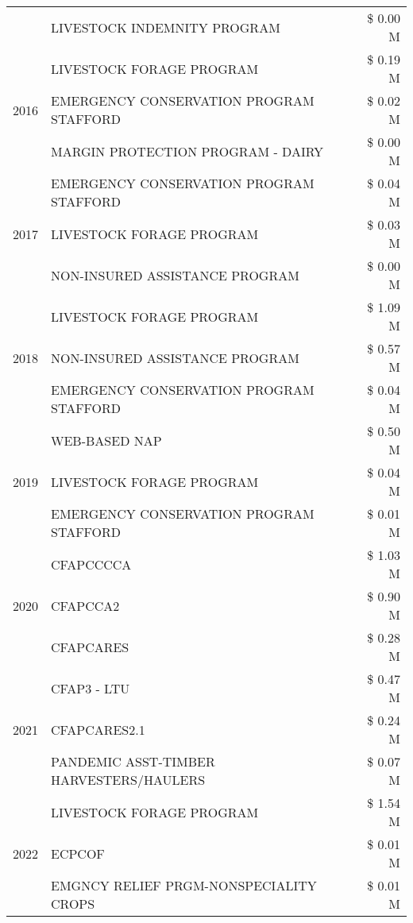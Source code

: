 \begin{tabular}{llr}
 & LIVESTOCK INDEMNITY PROGRAM & \$ 0.00 M \\
\cline{1-3}
\multirow[t]{3}{*}{2016} & LIVESTOCK FORAGE PROGRAM & \$ 0.19 M \\
 & EMERGENCY CONSERVATION PROGRAM STAFFORD & \$ 0.02 M \\
 & MARGIN PROTECTION PROGRAM - DAIRY & \$ 0.00 M \\
\cline{1-3}
\multirow[t]{3}{*}{2017} & EMERGENCY CONSERVATION PROGRAM STAFFORD & \$ 0.04 M \\
 & LIVESTOCK FORAGE PROGRAM & \$ 0.03 M \\
 & NON-INSURED ASSISTANCE PROGRAM & \$ 0.00 M \\
\cline{1-3}
\multirow[t]{3}{*}{2018} & LIVESTOCK FORAGE PROGRAM & \$ 1.09 M \\
 & NON-INSURED ASSISTANCE PROGRAM & \$ 0.57 M \\
 & EMERGENCY CONSERVATION PROGRAM STAFFORD & \$ 0.04 M \\
\cline{1-3}
\multirow[t]{3}{*}{2019} & WEB-BASED NAP & \$ 0.50 M \\
 & LIVESTOCK FORAGE PROGRAM & \$ 0.04 M \\
 & EMERGENCY CONSERVATION PROGRAM STAFFORD & \$ 0.01 M \\
\cline{1-3}
\multirow[t]{3}{*}{2020} & CFAPCCCCA & \$ 1.03 M \\
 & CFAPCCA2 & \$ 0.90 M \\
 & CFAPCARES & \$ 0.28 M \\
\cline{1-3}
\multirow[t]{3}{*}{2021} & CFAP3 - LTU & \$ 0.47 M \\
 & CFAPCARES2.1 & \$ 0.24 M \\
 & PANDEMIC ASST-TIMBER HARVESTERS/HAULERS & \$ 0.07 M \\
\cline{1-3}
\multirow[t]{3}{*}{2022} & LIVESTOCK FORAGE PROGRAM & \$ 1.54 M \\
 & ECPCOF & \$ 0.01 M \\
 & EMGNCY RELIEF PRGM-NONSPECIALITY CROPS & \$ 0.01 M \\
\cline{1-3}
\bottomrule
\end{tabular}
